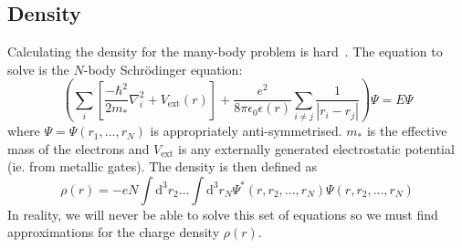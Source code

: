 \documentclass[12pt]{article}
\newcommand{\dd}{\text{d}}
\newcommand{\commentout}[1]{}
\begin{document}
\subsection{Density}

Calculating the density for the many-body problem is hard~\cite{:-P}.  The equation
to solve is the $N$-body Schr\"{o}dinger equation:
%
\begin{equation}
    \left( \sum_i \left[ \frac{-\hbar^2}{2 m_*} \nabla^2_i + V_{\mathrm{ext}} (r)\right] + \frac{e^2}{8 \pi \epsilon_0 \epsilon (r)} \sum_{i \neq j} \frac{1}{|r_i - r_j|} \right) \Psi = E \Psi
\end{equation}
%
where $\Psi = \Psi (r_1, \ldots, r_N)$ is appropriately anti-symmetrised.  $m_*$
is the effective mass of the electrons and $V_{\mathrm{ext}}$ is any externally
generated electrostatic potential (ie. from metallic gates).  The density is then
defined as
%
\begin{equation}
    \rho (r) = -e N \int \dd^3 r_2 \ldots \int \dd^3 r_N \Psi^* (r, r_2, \ldots, r_N) \Psi(r, r_2, \ldots, r_N)
\end{equation}
%
In reality, we will never be able to solve this set of equations so we must find
approximations for the charge density $\rho (r)$.

\commentout{
\subsubsection{Thomas-Fermi semi-classical approximation}

The first approximation is the simplest.  We assume that the electrons have a density
at $r$ which is equivalent to what the bulk density would be for the chemical potential
at this point $\mu (r)$.
}
\end{document}

